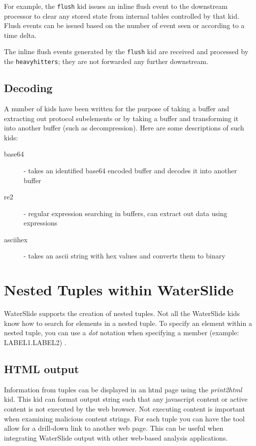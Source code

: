 \documentclass[11pt]{article}
\begin{document}
For example, the \texttt{flush} kid issues an inline flush event to the downstream processor to clear any stored state
from internal tables controlled by that kid. Flush events can be issued based on the number of event
seen or according to a time delta.

The inline flush events generated by the \texttt{flush} kid are received and processed by the
\texttt{heavyhitters}; they are not forwarded any further downstream.

\subsection {Decoding}
A number of kids have been written for the purpose of taking a buffer and extracting out protocol
subelements or by taking a buffer and transforming it into another buffer (such as decompression).
Here are some descriptions of such kids:
\begin{description}
\item [base64] - takes an identified base64 encoded buffer and decodes it into another buffer
\item [re2] - regular expression searching in buffers, can extract out data using expressions
\item [asciihex] - takes an ascii string with hex values and converts them to binary
\end{description}

\section {Nested Tuples within WaterSlide}
WaterSlide supports the creation of nested tuples.   Not all the WaterSlide kids know how to search for
elements in a nested tuple.  To specify an element within a nested tuple, you can use a \emph{dot}
notation when specifying a member (example: LABEL1.LABEL2) . 

\subsection{HTML output}
Information from tuples can be displayed in an html page using the \emph{print2html} kid.  This kid can
format output string such that any javascript content or active content is not executed by the web
browser.  Not executing content is important when examining malicious content strings.  For each
tuple you can have the tool allow for a drill-down link to another web page.  This can be useful
when integrating WaterSlide output with other web-based analysis applications.
\end{document}
